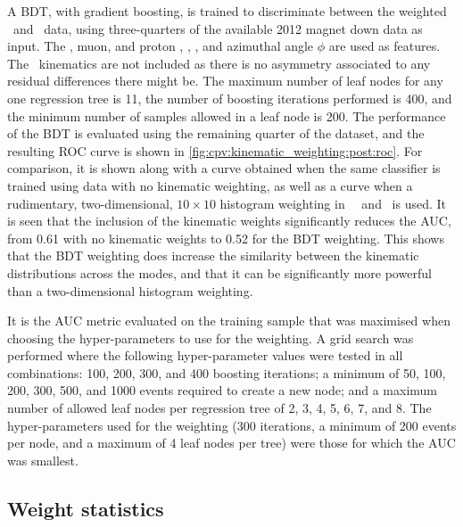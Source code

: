 A \ac{BDT}, with gradient boosting, is trained to discriminate between the 
weighted \pKK\ and \ppipi\ data, using three-quarters of the available 2012 
magnet down data as input.
The \PLambdab, muon, and proton \ptot, \pT, \Eta, and azimuthal angle $\phi$ 
are used as features.
The \PLambdac\ kinematics are not included as there is no asymmetry associated 
to any residual differences there might be.
The maximum number of leaf nodes for any one regression tree is 11, the number 
of boosting iterations performed is 400, and the minimum number of samples 
allowed in a leaf node is 200.
The performance of the \ac{BDT} is evaluated using the remaining quarter of the 
dataset, and the resulting \ac{ROC} curve is shown in 
\cref{fig:cpv:kinematic_weighting:post:roc}.
For comparison, it is shown along with a curve obtained when the same 
classifier is trained using data with no kinematic weighting, as well as a 
curve when a rudimentary, two-dimensional, $10\times10$ histogram weighting in 
\PLambdac\ \pT\ and \Eta\ is used.
It is seen that the inclusion of the kinematic weights significantly reduces 
the \ac{AUC}, from 0.61 with no kinematic weights to 0.52 for the \ac{BDT} 
weighting.
This shows that the \ac{BDT} weighting does increase the similarity between the 
kinematic distributions across the modes, and that it can be significantly more 
powerful than a two-dimensional histogram weighting.

It is the \ac{AUC} metric evaluated on the training sample that was maximised 
when choosing the hyper-parameters to use for the weighting.
A grid search was performed where the following hyper-parameter values were 
tested in all combinations: 100, 200, 300, and 400 boosting iterations; a 
minimum of 50, 100, 200, 300, 500, and 1000 events required to create a new 
node; and a maximum number of allowed leaf nodes per regression tree of 2, 3, 
4, 5, 6, 7, and 8.
The hyper-parameters used for the weighting (300 iterations, a minimum of 200 
events per node, and a maximum of 4 leaf nodes per tree) were those for which 
the \ac{AUC} was smallest.

\subsection{Weight statistics}
\label{chap:cpv:kinematic_weighting:validation:stats}

